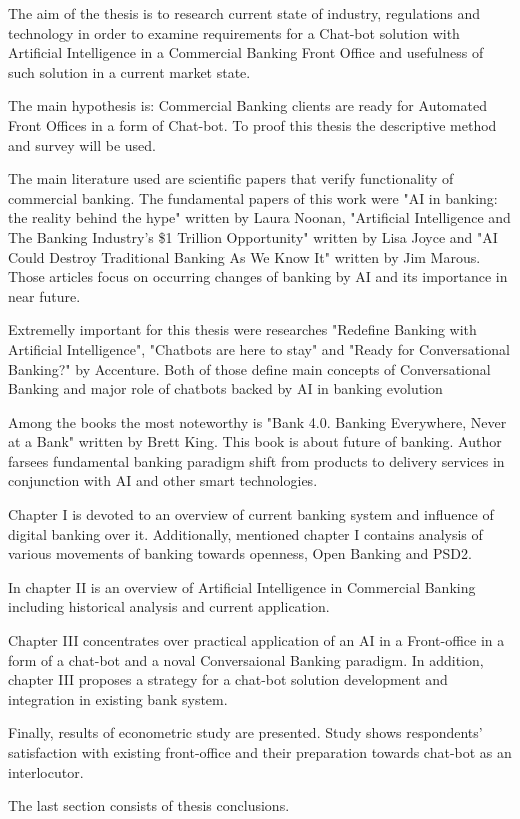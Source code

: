 

The aim of the thesis is to research current state of industry, regulations and technology in order to examine requirements for a Chat-bot solution with Artificial Intelligence in a Commercial Banking Front Office and usefulness of such solution in a current market state.

The main hypothesis is: Commercial Banking clients are ready for Automated Front Offices in a form of Chat-bot.
To proof this thesis the descriptive method and survey will be used.

The main literature used are scientific papers that verify functionality of commercial banking. 
The fundamental papers of this work were "AI in banking: the reality behind the hype" written by Laura Noonan, "Artificial Intelligence and The Banking Industry’s \$1 Trillion Opportunity" written by Lisa Joyce and "AI Could Destroy Traditional Banking As We Know It" written by Jim Marous.
Those articles focus on occurring changes of banking by AI and its importance in near future. 

Extremelly important for this thesis were researches "Redefine Banking with Artificial Intelligence", "Chatbots are here to stay" and "Ready for Conversational Banking?" by Accenture.
Both of those define main concepts of Conversational Banking and major role of chatbots backed by AI in banking evolution 

Among the books the most noteworthy is "Bank 4.0. Banking Everywhere, Never at a Bank" written by Brett King.
This book is about future of banking.
Author farsees fundamental banking paradigm shift from products to delivery services in conjunction with AI and other smart technologies.

Chapter I is devoted to an overview of current banking system and influence of digital banking over it.
Additionally, mentioned chapter I contains analysis of various movements of banking towards openness, Open Banking and PSD2.

In chapter II is an overview of Artificial Intelligence in Commercial Banking including historical analysis and current application.

Chapter III concentrates over practical application of an AI in a Front-office in a form of a chat-bot and a noval Conversaional Banking paradigm.
In addition, chapter III proposes a strategy for a chat-bot solution development and integration in existing bank system.

Finally, results of econometric study are presented. 
Study shows respondents' satisfaction with existing front-office and their preparation towards chat-bot as an interlocutor.

The last section consists of thesis conclusions. 
